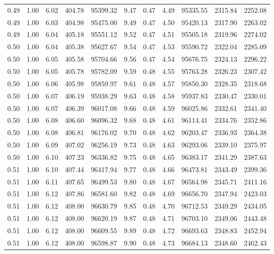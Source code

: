 \begin{table}[!ht]
\begin{tabular}{rrrrrrrrrrr}
0.49 & 1.00 & 6.02 & 404.78 & 95399.32 & 9.47 & 0.47 & 4.49 & 95335.55 & 2315.84 & 2252.08 \\
0.49 & 1.00 & 6.03 & 404.98 & 95475.00 & 9.49 & 0.47 & 4.50 & 95420.13 & 2317.90 & 2263.02 \\
0.49 & 1.00 & 6.04 & 405.18 & 95551.12 & 9.52 & 0.47 & 4.51 & 95505.18 & 2319.96 & 2274.02 \\
0.50 & 1.00 & 6.04 & 405.38 & 95627.67 & 9.54 & 0.47 & 4.53 & 95590.72 & 2322.04 & 2285.09 \\
0.50 & 1.00 & 6.05 & 405.58 & 95704.66 & 9.56 & 0.47 & 4.54 & 95676.75 & 2324.13 & 2296.22 \\
0.50 & 1.00 & 6.05 & 405.78 & 95782.09 & 9.59 & 0.48 & 4.55 & 95763.28 & 2326.23 & 2307.42 \\
0.50 & 1.00 & 6.06 & 405.98 & 95859.97 & 9.61 & 0.48 & 4.57 & 95850.30 & 2328.35 & 2318.68 \\
0.50 & 1.00 & 6.07 & 406.19 & 95938.29 & 9.63 & 0.48 & 4.58 & 95937.83 & 2330.47 & 2330.01 \\
0.50 & 1.00 & 6.07 & 406.39 & 96017.08 & 9.66 & 0.48 & 4.59 & 96025.86 & 2332.61 & 2341.40 \\
0.50 & 1.00 & 6.08 & 406.60 & 96096.32 & 9.68 & 0.48 & 4.61 & 96114.41 & 2334.76 & 2352.86 \\
0.50 & 1.00 & 6.08 & 406.81 & 96176.02 & 9.70 & 0.48 & 4.62 & 96203.47 & 2336.93 & 2364.38 \\
0.50 & 1.00 & 6.09 & 407.02 & 96256.19 & 9.73 & 0.48 & 4.63 & 96293.06 & 2339.10 & 2375.97 \\
0.50 & 1.00 & 6.10 & 407.23 & 96336.82 & 9.75 & 0.48 & 4.65 & 96383.17 & 2341.29 & 2387.63 \\
0.51 & 1.00 & 6.10 & 407.44 & 96417.94 & 9.77 & 0.48 & 4.66 & 96473.81 & 2343.49 & 2399.36 \\
0.51 & 1.00 & 6.11 & 407.65 & 96499.53 & 9.80 & 0.48 & 4.67 & 96564.98 & 2345.71 & 2411.16 \\
0.51 & 1.00 & 6.12 & 407.86 & 96581.60 & 9.82 & 0.48 & 4.69 & 96656.70 & 2347.94 & 2423.03 \\
0.51 & 1.00 & 6.12 & 408.00 & 96630.79 & 9.85 & 0.48 & 4.70 & 96712.53 & 2349.29 & 2434.05 \\
0.51 & 1.00 & 6.12 & 408.00 & 96620.19 & 9.87 & 0.48 & 4.71 & 96703.10 & 2349.06 & 2443.48 \\
0.51 & 1.00 & 6.12 & 408.00 & 96609.55 & 9.89 & 0.48 & 4.72 & 96693.63 & 2348.83 & 2452.94 \\
0.51 & 1.00 & 6.12 & 408.00 & 96598.87 & 9.90 & 0.48 & 4.73 & 96684.13 & 2348.60 & 2462.43 \\

\end{tabular}
\end{table}
